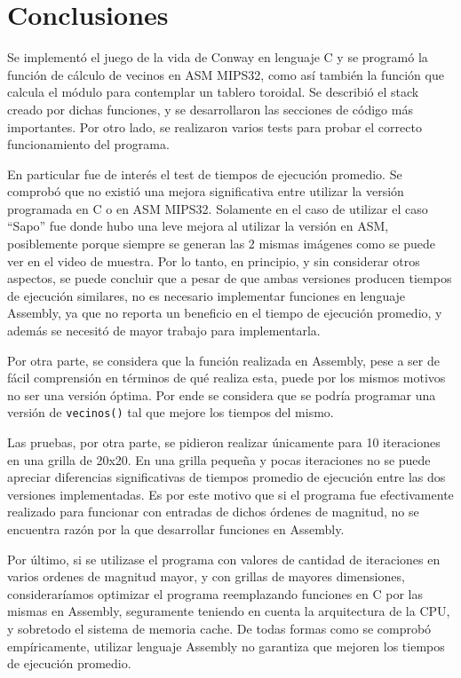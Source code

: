 \documentclass[a4paper,12pt]{article}
\newcommand{\quotes}[1]{``#1''}
\numberwithin{equation}{section}
\numberwithin{figure}{section}
\begin{document}
\section{Conclusiones}

Se implementó el juego de la vida de Conway en lenguaje C y se programó la función de cálculo de vecinos en ASM MIPS32, como así también la función que calcula el módulo para contemplar un tablero toroidal. Se describió el stack creado por dichas funciones, y se desarrollaron las secciones de código más importantes. Por otro lado, se realizaron varios tests para probar el correcto funcionamiento del programa.

En particular fue de interés el test de tiempos de ejecución promedio. Se comprobó que no existió una mejora significativa entre utilizar la versión programada en C o en ASM MIPS32. Solamente en el caso de utilizar el caso \quotes{Sapo} fue donde hubo una leve mejora al utilizar la versión en ASM, posiblemente porque siempre se generan las 2 mismas imágenes como se puede ver en el video de muestra. Por lo tanto, en principio, y sin considerar otros aspectos, se puede concluir que a pesar de que ambas versiones producen tiempos de ejecución similares, no es necesario implementar funciones en lenguaje Assembly, ya que no reporta un beneficio en el tiempo de ejecución promedio, y además se necesitó de mayor trabajo para implementarla.

Por otra parte, se considera que la función realizada en Assembly, pese a ser de fácil comprensión en términos de qué realiza esta, puede por los mismos motivos no ser una versión óptima. Por ende se considera que se podría programar una versión de \texttt{vecinos()} tal que mejore los tiempos del mismo.

Las pruebas, por otra parte, se pidieron realizar únicamente para 10 iteraciones en una grilla de 20x20. En una grilla pequeña y pocas iteraciones no se puede apreciar diferencias significativas de tiempos promedio de ejecución entre las dos versiones implementadas. Es por este motivo que si el programa fue efectivamente realizado para funcionar con entradas de dichos órdenes de magnitud, no se encuentra razón por la que desarrollar funciones en Assembly.

Por último, si se utilizase el programa con valores de cantidad de iteraciones en varios ordenes de magnitud mayor, y con grillas de mayores dimensiones, consideraríamos optimizar el programa reemplazando funciones en C por las mismas en Assembly, seguramente teniendo en cuenta la arquitectura de la CPU, y sobretodo el sistema de memoria cache. De todas formas como se comprobó empíricamente, utilizar lenguaje Assembly no garantiza que mejoren los tiempos de ejecución promedio.
\end{document}

